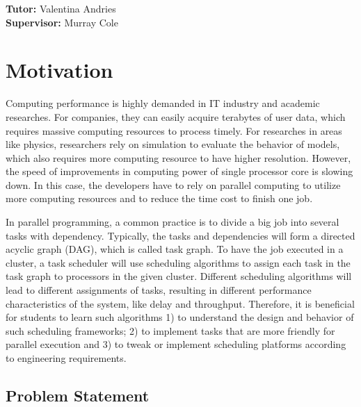 \documentclass[a4paper,11pt]{article}
\newcommand{\tutor}{Valentina Andries}
\newcommand{\supervisor}{Murray Cole}
\begin{document}
\vfill
{\bf Tutor:} \tutor\\
{\bf Supervisor:} \supervisor
\newpage

\setcounter{page}{1}                            %
\footruleheight{1pt}
\headruleheight{1pt}
\rhead{- \thepage}
\cfoot{}
%
\tableofcontents                                %

\section{Motivation}

Computing performance is highly demanded in IT industry and academic researches. For companies, they can easily acquire terabytes of user data, which requires massive computing resources to process timely. For researches in areas like physics, researchers rely on simulation to evaluate the behavior of models, which also requires more computing resource to have higher resolution. However, the speed of improvements in computing power of single processor core is slowing down. In this case, the developers have to rely on parallel computing to utilize more computing resources and to reduce the time cost to finish one job.

In parallel programming, a common practice is to divide a big job into several tasks with dependency. Typically, the tasks and dependencies will form a directed acyclic graph (DAG), which is called task graph\cite{Robert2011}. To have the job executed in a cluster, a task scheduler will use scheduling algorithms to assign each task in the task graph to processors in the given cluster. Different scheduling algorithms will lead to different assignments of tasks, resulting in different performance characteristics of the system, like delay and throughput. Therefore, it is beneficial for students to learn such algorithms 1) to understand the design and behavior of such scheduling frameworks; 2) to implement tasks that are more friendly for parallel execution and 3) to tweak or implement scheduling platforms according to engineering requirements.

\subsection{Problem Statement} \label{sec:prob}
\end{document}
